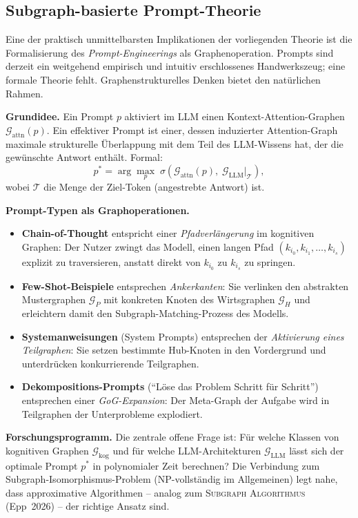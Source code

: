 ﻿\documentclass[12pt,a4paper]{article}
\theoremstyle{plain}
\theoremstyle{definition}
\theoremstyle{remark}
\newcommand{\GG}{\mathcal{G}}
\newcommand{\SA}{\textnormal{\textsc{Subgraph Algorithmus}}}
\begin{document}
\subsection{Subgraph-basierte Prompt-Theorie}
\label{subsec:prompt}

Eine der praktisch unmittelbarsten Implikationen der vorliegenden Theorie ist die Formalisierung des \emph{Prompt-Engineerings} als Graphenoperation. Prompts sind derzeit ein weitgehend empirisch und intuitiv erschlossenes Handwerkszeug; eine formale Theorie fehlt. Graphenstrukturelles Denken bietet den natürlichen Rahmen.

\textbf{Grundidee.} Ein Prompt $p$ aktiviert im LLM einen Kontext-Attention-Graphen $\GG_{\text{attn}}(p)$. Ein effektiver Prompt ist einer, dessen induzierter Attention-Graph maximale strukturelle Überlappung mit dem Teil des LLM-Wissens hat, der die gewünschte Antwort enthält. Formal:
\[
  p^* = \arg\max_p\; \sigma\!\left(\GG_{\text{attn}}(p),\; \GG_{\text{LLM}}|_{\mathcal{T}}\right),
\]
wobei $\mathcal{T}$ die Menge der Ziel-Token (angestrebte Antwort) ist.

\textbf{Prompt-Typen als Graphoperationen.}
\begin{itemize}
  \item \textbf{Chain-of-Thought} entspricht einer \emph{Pfadverlängerung} im kognitiven Graphen: Der Nutzer zwingt das Modell, einen langen Pfad $(k_{i_0}, k_{i_1}, \ldots, k_{i_s})$ explizit zu traversieren, anstatt direkt von $k_{i_0}$ zu $k_{i_s}$ zu springen.
  \item \textbf{Few-Shot-Beispiele} entsprechen \emph{Ankerkanten}: Sie verlinken den abstrakten Mustergraphen $\GG_P$ mit konkreten Knoten des Wirtsgraphen $\GG_H$ und erleichtern damit den Subgraph-Matching-Prozess des Modells.
  \item \textbf{Systemanweisungen} (System Prompts) entsprechen der \emph{Aktivierung eines Teilgraphen}: Sie setzen bestimmte Hub-Knoten in den Vordergrund und unterdrücken konkurrierende Teilgraphen.
  \item \textbf{Dekompositions-Prompts} (``Löse das Problem Schritt für Schritt'') entsprechen einer \emph{GoG-Expansion}: Der Meta-Graph der Aufgabe wird in Teilgraphen der Unterprobleme explodiert.
\end{itemize}

\textbf{Forschungsprogramm.} Die zentrale offene Frage ist: Für welche Klassen von kognitiven Graphen $\GG_{\text{kog}}$ und für welche LLM-Architekturen $\GG_{\text{LLM}}$ lässt sich der optimale Prompt $p^*$ in polynomialer Zeit berechnen? Die Verbindung zum Subgraph-Isomorphismus-Problem (NP-vollständig im Allgemeinen) legt nahe, dass approximative Algorithmen -- analog zum \SA{} (Epp~2026) -- der richtige Ansatz sind.
\end{document}
